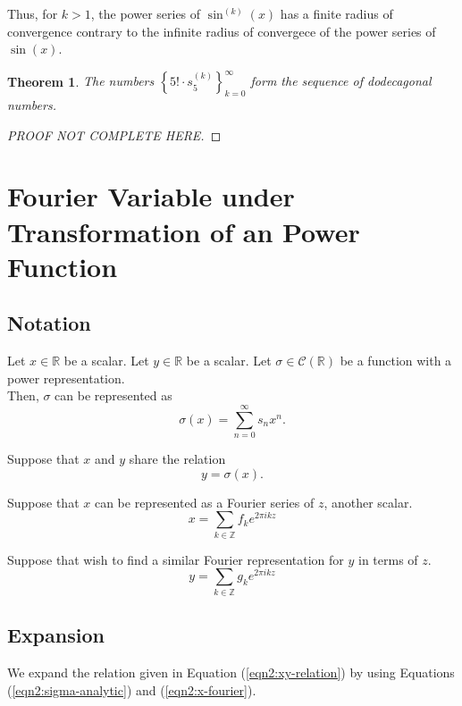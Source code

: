 \documentclass{article}
\newtheorem{theorem}{Theorem}
\begin{document}
    Thus, for $k > 1$, the power series of $\sin^{(k)}(x)$ has a finite radius of convergence contrary to the infinite radius of convergece of the power series of $\sin(x)$.

    \begin{theorem}
        The numbers $\left\{5! \cdot s_{5}^{(k)}\right\}_{k=0}^{\infty}$ form the sequence of dodecagonal numbers.
    \end{theorem}
    \begin{proof}
        [PROOF NOT COMPLETE HERE]
    \end{proof}

    \section{Fourier Variable under Transformation of an Power Function}

    \subsection{Notation}
    Let $x \in \mathbb{R}$ be a scalar. Let $y \in \mathbb{R}$ be a scalar. Let $\sigma \in \mathcal{C}(\mathbb{R})$ be a function with a power representation.\\

    Then, $\sigma$ can be represented as
    \begin{equation}
        \sigma(x) = \sum_{n=0}^{\infty} s_n x^n.
        \label{eqn2:sigma-analytic}
    \end{equation}

    Suppose that $x$ and $y$ share the relation
    \begin{equation}
        y = \sigma(x).
        \label{eqn2:xy-relation}
    \end{equation}

    Suppose that $x$ can be represented as a Fourier series of $z$, another scalar.
    \begin{equation}
        x = \sum_{k \in \mathbb{Z}} f_k e^{2\pi i k z}
        \label{eqn2:x-fourier}
    \end{equation}

    Suppose that wish to find a similar Fourier representation for $y$ in terms of $z$.
    \begin{equation}
        y = \sum_{k \in \mathbb{Z}} g_k e^{2\pi i k z}
        \label{eqn2:y-fourier}
    \end{equation}

    \subsection{Expansion}
    We expand the relation given in Equation (\ref{eqn2:xy-relation}) by using Equations (\ref{eqn2:sigma-analytic}) and (\ref{eqn2:x-fourier}).
\end{document}

